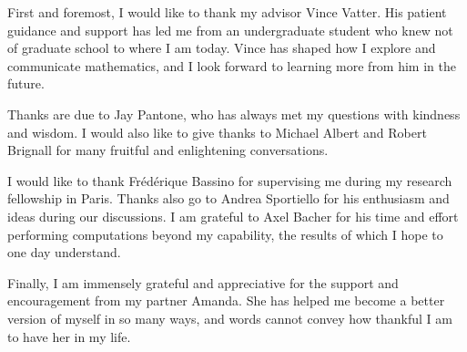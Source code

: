 First and foremost, I would like to thank my advisor Vince Vatter. His patient guidance and support has led me from an undergraduate student who knew not of graduate school to where I am today. Vince has shaped how I explore and communicate mathematics, and I look forward to learning more from him in the future.

Thanks are due to Jay Pantone, who has always met my questions with kindness and wisdom. I would also like to give thanks to Michael Albert and Robert Brignall for many fruitful and enlightening conversations. 

I would like to thank Fr\'ed\'erique Bassino for supervising me during my research fellowship in Paris. Thanks also go to Andrea Sportiello for his enthusiasm and ideas during our discussions. I am grateful to Axel Bacher for his time and effort performing computations beyond my capability, the results of which I hope to one day understand.

Finally, I am immensely grateful and appreciative for the support and encouragement from my partner Amanda. She has helped me become a better version of myself in so many ways, and words cannot convey how thankful I am to have her in my life.